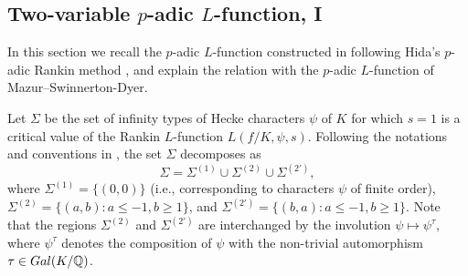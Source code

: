 \documentclass[a4paper,10pt]{amsart}
\numberwithin{equation}{section}
\numberwithin{equation}{section}
\theoremstyle{plain}
\theoremstyle{definition}
\newtheorem{rmk}[thm]{Remark}
\theoremstyle{definition}
\theoremstyle{plain}
\theoremstyle{plain}
\theoremstyle{plain}
\theoremstyle{plain}
\newcommand{\Z}{\mathbb{Z}}
\newcommand{\Q}{\mathbb{Q}}
\newcommand{\Lcal}{\mathcal{L}}
\begin{document}

\subsection{Two-variable $p$-adic $L$-function, I}
\label{subsec:L-2var-I} 

In this section we recall the $p$-adic $L$-function constructed in \cite{PR-JLMS} following Hida's $p$-adic Rankin method \cite{hida-measure-I}, and explain the relation with the $p$-adic $L$-function of Mazur--Swinnerton-Dyer. 

Let $\Sigma$ be the set of infinity types of Hecke characters $\psi$ of $K$ for which $s=1$ is a critical value of the Rankin $L$-function $L(f/K,\psi,s)$. Following the notations and conventions in \cite[\S{6.1}]{LLZ-K}, the set $\Sigma$ decomposes as 
\[
\Sigma=\Sigma^{(1)}\cup\Sigma^{(2)}\cup\Sigma^{(2')},
\]
where $\Sigma^{(1)}=\{(0,0)\}$ (i.e., corresponding to characters $\psi$ of finite order), $\Sigma^{(2)}=\{(a,b)\colon a\leq -1, b\geq 1\}$, and $\Sigma^{(2')}=\{(b,a)\colon a\leq -1, b\geq 1\}$. Note that the regions $\Sigma^{(2)}$ and $\Sigma^{(2')}$ are interchanged by the involution $\psi\mapsto\psi^\tau$, where $\psi^\tau$ denotes the composition of $\psi$ with the non-trivial automorphism $\tau\in{\rm Gal}(K/\Q)$.
\end{document}
